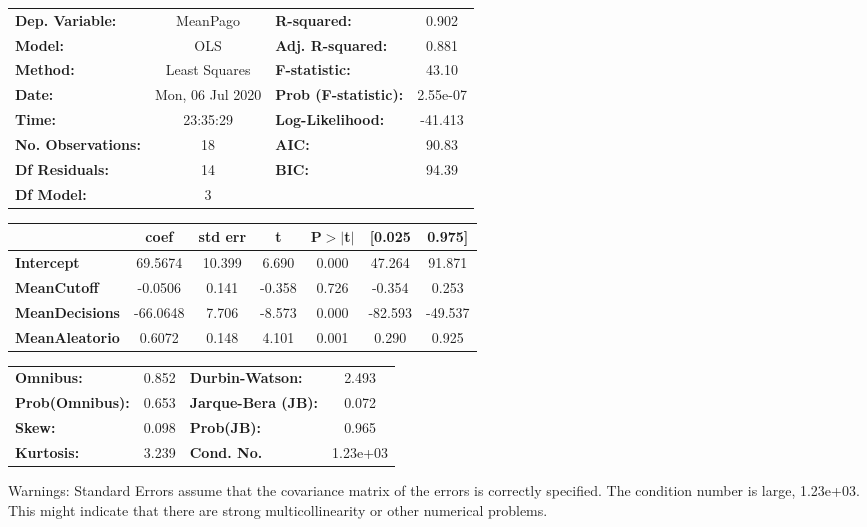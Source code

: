\documentclass{report}
\begin{document}
\begin{center}
\begin{tabular}{lclc}
\toprule
\textbf{Dep. Variable:}    &     MeanPago     & \textbf{  R-squared:         } &     0.902   \\
\textbf{Model:}            &       OLS        & \textbf{  Adj. R-squared:    } &     0.881   \\
\textbf{Method:}           &  Least Squares   & \textbf{  F-statistic:       } &     43.10   \\
\textbf{Date:}             & Mon, 06 Jul 2020 & \textbf{  Prob (F-statistic):} &  2.55e-07   \\
\textbf{Time:}             &     23:35:29     & \textbf{  Log-Likelihood:    } &   -41.413   \\
\textbf{No. Observations:} &          18      & \textbf{  AIC:               } &     90.83   \\
\textbf{Df Residuals:}     &          14      & \textbf{  BIC:               } &     94.39   \\
\textbf{Df Model:}         &           3      & \textbf{                     } &             \\
\bottomrule
\end{tabular}
\begin{tabular}{lcccccc}
                       & \textbf{coef} & \textbf{std err} & \textbf{t} & \textbf{P$> |$t$|$} & \textbf{[0.025} & \textbf{0.975]}  \\
\midrule
\textbf{Intercept}     &      69.5674  &       10.399     &     6.690  &         0.000        &       47.264    &       91.871     \\
\textbf{MeanCutoff}    &      -0.0506  &        0.141     &    -0.358  &         0.726        &       -0.354    &        0.253     \\
\textbf{MeanDecisions} &     -66.0648  &        7.706     &    -8.573  &         0.000        &      -82.593    &      -49.537     \\
\textbf{MeanAleatorio} &       0.6072  &        0.148     &     4.101  &         0.001        &        0.290    &        0.925     \\
\bottomrule
\end{tabular}
\begin{tabular}{lclc}
\textbf{Omnibus:}       &  0.852 & \textbf{  Durbin-Watson:     } &    2.493  \\
\textbf{Prob(Omnibus):} &  0.653 & \textbf{  Jarque-Bera (JB):  } &    0.072  \\
\textbf{Skew:}          &  0.098 & \textbf{  Prob(JB):          } &    0.965  \\
\textbf{Kurtosis:}      &  3.239 & \textbf{  Cond. No.          } & 1.23e+03  \\
\bottomrule
\end{tabular}
\end{center}

Warnings: \newline
 [1] Standard Errors assume that the covariance matrix of the errors is correctly specified. \newline
 [2] The condition number is large, 1.23e+03. This might indicate that there are \newline
 strong multicollinearity or other numerical problems.
\end{document}
